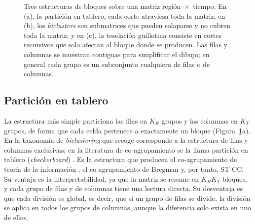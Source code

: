 \begin{figure}[t]
\centering
{}
\caption{Tres estructuras de bloques sobre una matriz región~$\times$~tiempo.
En (a), la partición en tablero, cada corte atraviesa toda la matriz; en (b), los
\emph{biclusters} son submatrices que pueden solaparse y no cubren toda la matriz; y en
(c), la teselación guillotina consiste en cortes recursivos que solo afectan al
bloque donde se producen. Las
filas y columnas se muestran contiguas para simplificar el dibujo; en general
cada grupo es un subconjunto cualquiera de filas o de columnas.}
\label{fig:estructuras}
\end{figure}

\subsection{Partición en tablero}

La estructura más simple particiona las filas en $K_R$ grupos y las columnas en
$K_T$ grupos, de forma que cada celda pertenece a exactamente un bloque
(Figura~\ref{fig:estructuras}a). En la taxonomía de \emph{biclustering} que recoge
\citet{Castanho2024} corresponde a la estructura de filas y columnas exclusivas;
en la literatura de co-agrupamiento se la llama partición en tablero
(\emph{checkerboard}) \citep{Liu2021}. Es la estructura que producen el
co-agrupamiento de teoría de la información \citep{Dhillon2003}, el co-agrupamiento
de Bregman \citep{Banerjee2007} y, por tanto, ST-CC. Su ventaja es la
interpretabilidad, ya que la matriz se resume en $K_R K_T$ bloques, y cada grupo de filas
y de columnas tiene una lectura directa. Su desventaja es que cada división es
global, es decir, que si un grupo de filas se divide, la división se aplica en todos los
grupos de columnas, aunque la diferencia solo exista en uno de ellos.

